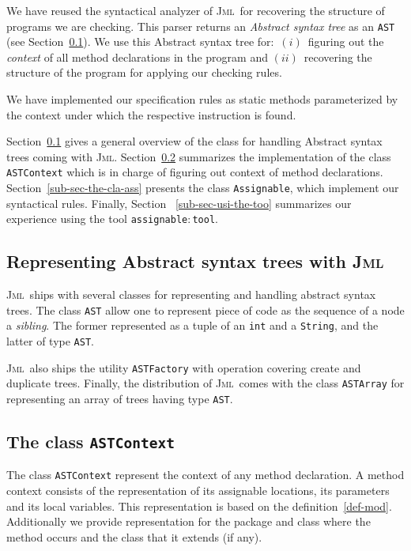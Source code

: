 \documentclass[a4paper]{llncs}
\newcommand{\jml}{\textsc{Jml}}
\newcommand{\modtool}{\texttt{assignable$:$tool}}
\begin{document}
We have reused the syntactical analyzer of \jml~for recovering the
structure of programs we are checking. This parser returns an
\emph{Abstract syntax tree} as an \texttt{AST} (see
Section~\ref{abo-jml-cla-use}). We use this Abstract syntax tree
for$:$ $(i)$~figuring out the \emph{context} of all method
declarations in the program and $(ii)$~recovering the structure of the
program for applying our checking rules.

We have implemented our specification rules as static methods
parameterized by the context under which the respective instruction is
found.

Section~\ref{abo-jml-cla-use} gives a general overview of the class
for handling Abstract syntax trees coming with
\jml. Section~\ref{sub-sec-cla-ast-con} summarizes the implementation
of the class \texttt{ASTContext} which is in charge of figuring out
context of method declarations. Section~\ref{sub-sec-the-cla-ass}
presents the class \texttt{Assignable}, which implement our
syntactical rules. Finally, Section ~\ref{sub-sec-usi-the-too}
summarizes our experience using the tool \modtool.




\subsection{Representing Abstract syntax trees with \jml}
\label{abo-jml-cla-use}

\jml~ships with several classes for representing and handling abstract
syntax trees. The class \texttt{AST} allow one to represent piece of
code as the sequence of a node a \emph{sibling}. The former
represented as a tuple of an \texttt{int} and a \texttt{String}, and
the latter of type \texttt{AST}.

\jml~also ships the utility \texttt{ASTFactory} with operation
covering create and duplicate trees. Finally, the distribution of
\jml~comes with the class \texttt{ASTArray} for representing an array
of trees having type \texttt{AST}.





\subsection{The class \texttt{ASTContext}}
\label{sub-sec-cla-ast-con}
The class \texttt{ASTContext} represent the context of any method
declaration. A method context consists of the representation of its
assignable locations, its parameters and its local variables. This
representation is based on the definition~\ref{def-mod}. Additionally
we provide representation for the package and class where the method
occurs and the class that it extends (if any).
\end{document}
